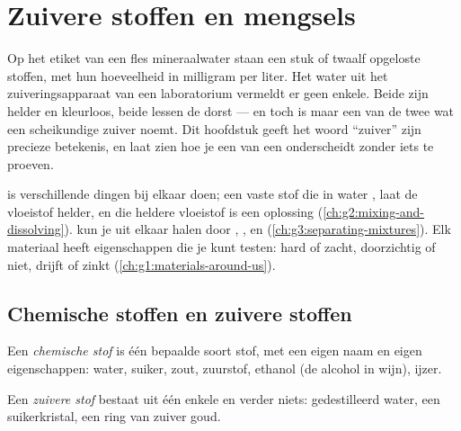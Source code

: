 \chapter{Zuivere stoffen en mengsels}\label{ch:g6:pure-substances-and-mixtures}

Op het etiket van een fles mineraalwater staan een stuk of twaalf
opgeloste stoffen, met hun hoeveelheid in milligram per liter. Het water
uit het zuiveringsapparaat van een laboratorium vermeldt er geen enkele.
Beide zijn helder en kleurloos, beide lessen de dorst --- en toch is maar
een van de twee wat een scheikundige zuiver noemt. Dit hoofdstuk geeft
het woord ``zuiver'' zijn precieze betekenis, en laat zien hoe je een
 van een  onderscheidt zonder iets te proeven.

\begin{recall}
 is verschillende dingen bij elkaar doen; een vaste stof die in
water , laat de vloeistof helder, en die heldere vloeistof is een
oplossing (\cref{ch:g2:mixing-and-dissolving}).  kun je uit
elkaar halen door , ,  en 
(\cref{ch:g3:separating-mixtures}). Elk materiaal heeft eigenschappen
die je kunt testen: hard of zacht, doorzichtig of niet, drijft of zinkt
(\cref{ch:g1:materials-around-us}).
\end{recall}

\section{Chemische stoffen en zuivere stoffen}

\begin{definition}\label{def:g6:pure-substances-and-mixtures:species}
Een \emph{chemische stof} is één bepaalde soort
stof, met een eigen naam en eigen eigenschappen: water, suiker, zout,
zuurstof, ethanol (de alcohol in wijn), ijzer.
\end{definition}

\begin{definition}\label{def:g6:pure-substances-and-mixtures:pure-substance}
Een \emph{zuivere stof} bestaat uit één enkele
 en verder niets: gedestilleerd water, een suikerkristal,
een ring van zuiver goud.
\end{definition}

